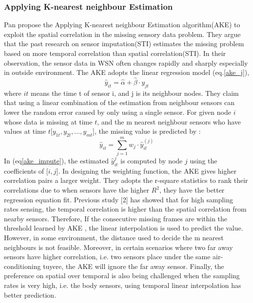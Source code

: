  \subsubsection{Applying K-nearest neighbour Estimation}
Pan\cite{pan2010k} propose the Applying K-nearest neighbour Estimation algorithm(AKE) to exploit the spatial correlation in the missing sensory data problem. They argue that the past research on sensor imputation(STI) estimates the missing problem based on more temporal correlation than spatial correlation(STI). In their observation, the sensor data in WSN often changes rapidly and sharply especially in outside environment. The AKE adopts the linear regression model (eq.\ref{ake_j}),
\begin{equation}
\hat{y}_{it} =\hat{\alpha} +\hat{\beta}\cdot y_{jt}
\label{ake_j}
\end{equation}
 where $it$ means the time t of sensor i,  and j is its neighbour nodes.  
They claim that using a linear combination of the estimation from neighbour sensors can lower the random error caused by only using a single sensor. 
For given node $i$ whose data is missing at time $t$, and the m nearest neighbour sensors who have values at time $t$[$y_{1t}, y_{2t},\dots, y_{mt}$], the missing value is predicted by :   
 \begin{equation}
 \hat{y}_{it} =\sum_{j=1}^m w_j \cdot \hat{y}_{it}^{(j)}
 \label{ake_impute}
 \end{equation}
%
In (eq\ref{ake_impute}), the estimated $\hat{y}_{it}^{j}$ is computed by node $j$ using the coefficients of [$i,j$]. In designing the weighting function, the AKE gives higher correlation pairs a larger weight. They adopts the r-square statistics to rank their correlations due to when sensors have the higher $R^2$, they have the better regression equation fit. 
Previous study [2] has showed that for high sampling rates sensing, the temporal correlation is higher than the spatial correlation from nearby sensors. 
Therefore, If the consecutive missing frames are within the threshold learned by AKE , the linear interpolation is used to predict the value. 
However, in some environment, the distance used to decide the m nearest neighbours is not feasible. 
Moreover, in certain scenarios where two far away sensors have higher correlation, i.e. two sensors place under the same air-conditioning tuyere, the AKE will ignore the far away sensor.
Finally, the preference on spatial over temporal is also being challenged when the sampling rates is very high, i.e. the body sensors, using temporal linear interpolation has better prediction.   
